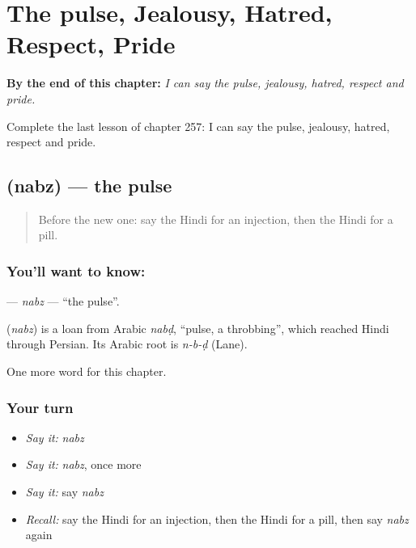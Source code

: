 
\chapter{The pulse, Jealousy, Hatred, Respect, Pride}
\label{ch:hi-the-pulse-jealousy-hatred-respect-pride}

\begin{chapteropening}
\textbf{By the end of this chapter:} \emph{I can say the pulse, jealousy, hatred, respect and pride.}

Complete the last lesson of chapter 257: I can say the pulse, jealousy, hatred, respect and pride.
\end{chapteropening}

\section[\texorpdfstring{\hi{नब्ज़} (nabz)}{नब्ज़ (nabz)}]{ (nabz) — the pulse}

\label{lesson:HI-C257-nabz}



\begin{quote}
Before the new one: say the Hindi for an injection, then the Hindi for a pill.
\end{quote}

\subsection*{You'll want to know: }
\textbf{} — \emph{nabz} — \textquotedblleft{}the pulse\textquotedblright{}.

\begin{cousinweb}
\textbf{} (\emph{nabz}) is a loan from Arabic \emph{nabḍ}, \textquotedblleft{}pulse, a throbbing\textquotedblright{}, which reached Hindi through Persian. Its Arabic root is \emph{n-b-ḍ} (Lane).
\end{cousinweb}

\begin{grammarlens}[title={What you've built}]
One more word for this chapter.
\end{grammarlens}

\subsection*{Your turn}
\begin{itemize}
\raggedright
  \item \emph{Say it:} \emph{nabz}
  \item \emph{Say it:} \emph{nabz}, once more
  \item \emph{Say it:} say \emph{nabz}
  \item \emph{Recall:} say the Hindi for an injection, then the Hindi for a pill, then say \emph{nabz} again
\end{itemize}

